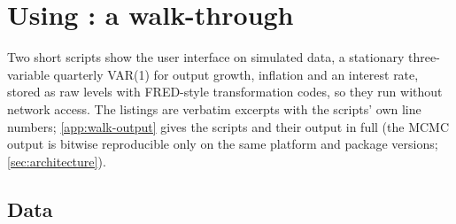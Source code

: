 \section{Using : a walk-through}\label{sec:walkthrough}

Two short scripts show the user interface on simulated data, a stationary three-variable quarterly
VAR(1) for output growth, inflation and an interest rate, stored as raw levels with FRED-style
transformation codes, so they run without network access.
The listings are verbatim excerpts with the scripts' own line numbers; \cref{app:walk-output}
gives the scripts and their output in full (the MCMC output is bitwise reproducible only on the
same platform and package versions; \cref{sec:architecture}).

\subsection{Data}\label{sec:walk-data}

